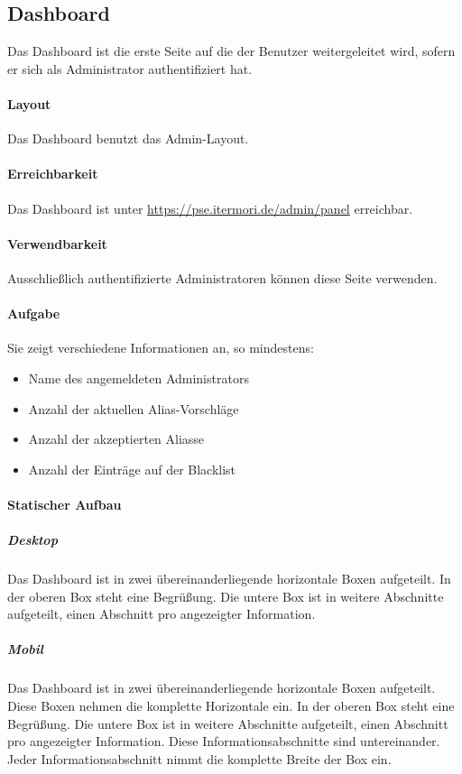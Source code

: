 \newpage
\subsection{Dashboard}

Das Dashboard ist die erste Seite auf die der Benutzer weitergeleitet wird, sofern er sich als Administrator authentifiziert hat.

\paragraph*{Layout}
Das Dashboard benutzt das Admin-Layout.

\paragraph*{Erreichbarkeit}
Das Dashboard ist unter \href{https://pse.itermori.de/admin/panel}{https://pse.itermori.de/admin/panel} erreichbar.

\paragraph*{Verwendbarkeit}
Ausschließlich authentifizierte Administratoren können diese Seite verwenden.

\paragraph*{Aufgabe}
Sie zeigt verschiedene Informationen an, so mindestens:

\begin{itemize}
    \item Name des angemeldeten Administrators
    \item Anzahl der aktuellen Alias-Vorschläge
    \item Anzahl der akzeptierten Aliasse
    \item Anzahl der Einträge auf der Blacklist
\end{itemize}

\paragraph*{Statischer Aufbau}\label{AP_Dashboard}
\subparagraph*{Desktop}
Das Dashboard ist in zwei übereinanderliegende horizontale Boxen aufgeteilt.
In der oberen Box steht eine Begrüßung.
Die untere Box ist in weitere Abschnitte aufgeteilt, einen Abschnitt pro angezeigter Information.

\subparagraph*{Mobil}
Das Dashboard ist in zwei übereinanderliegende horizontale Boxen aufgeteilt. Diese Boxen nehmen die komplette Horizontale ein.
In der oberen Box steht eine Begrüßung.
Die untere Box ist in weitere Abschnitte aufgeteilt, einen Abschnitt pro angezeigter Information.
Diese Informationsabschnitte sind untereinander.
Jeder Informationsabschnitt nimmt die komplette Breite der Box ein.

